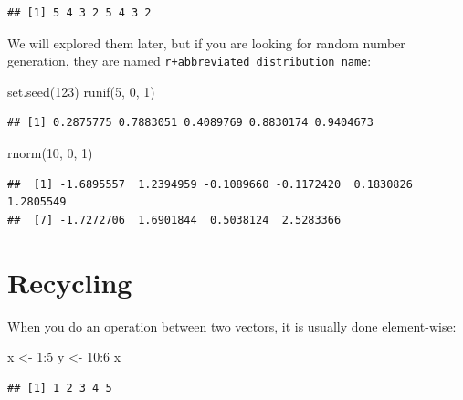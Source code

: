 \documentclass[
]{book}
\newenvironment{Shaded}{\begin{snugshade}}{\end{snugshade}}
\newcommand{\DecValTok}[1]{\textcolor[rgb]{0.00,0.00,0.81}{#1}}
\newcommand{\FunctionTok}[1]{\textcolor[rgb]{0.00,0.00,0.00}{#1}}
\newcommand{\NormalTok}[1]{#1}
\newcommand{\OtherTok}[1]{\textcolor[rgb]{0.56,0.35,0.01}{#1}}
\newcommand{\SpecialCharTok}[1]{\textcolor[rgb]{0.00,0.00,0.00}{#1}}
\begin{document}
\begin{verbatim}
## [1] 5 4 3 2 5 4 3 2
\end{verbatim}

We will explored them later, but if you are looking for random number generation, they are named \texttt{r+abbreviated\_distribution\_name}:

\begin{Shaded}
\begin{Highlighting}[]
\FunctionTok{set.seed}\NormalTok{(}\DecValTok{123}\NormalTok{)}
\FunctionTok{runif}\NormalTok{(}\DecValTok{5}\NormalTok{, }\DecValTok{0}\NormalTok{, }\DecValTok{1}\NormalTok{)}
\end{Highlighting}
\end{Shaded}

\begin{verbatim}
## [1] 0.2875775 0.7883051 0.4089769 0.8830174 0.9404673
\end{verbatim}

\begin{Shaded}
\begin{Highlighting}[]
\FunctionTok{rnorm}\NormalTok{(}\DecValTok{10}\NormalTok{, }\DecValTok{0}\NormalTok{, }\DecValTok{1}\NormalTok{)}
\end{Highlighting}
\end{Shaded}

\begin{verbatim}
##  [1] -1.6895557  1.2394959 -0.1089660 -0.1172420  0.1830826  1.2805549
##  [7] -1.7272706  1.6901844  0.5038124  2.5283366
\end{verbatim}

\hypertarget{recycling}{%
\section{Recycling}\label{recycling}}

When you do an operation between two vectors, it is usually done element-wise:

\begin{Shaded}
\begin{Highlighting}[]
\NormalTok{x }\OtherTok{\textless{}{-}} \DecValTok{1}\SpecialCharTok{:}\DecValTok{5}
\NormalTok{y }\OtherTok{\textless{}{-}} \DecValTok{10}\SpecialCharTok{:}\DecValTok{6}
\NormalTok{x}
\end{Highlighting}
\end{Shaded}

\begin{verbatim}
## [1] 1 2 3 4 5
\end{verbatim}
\end{document}

